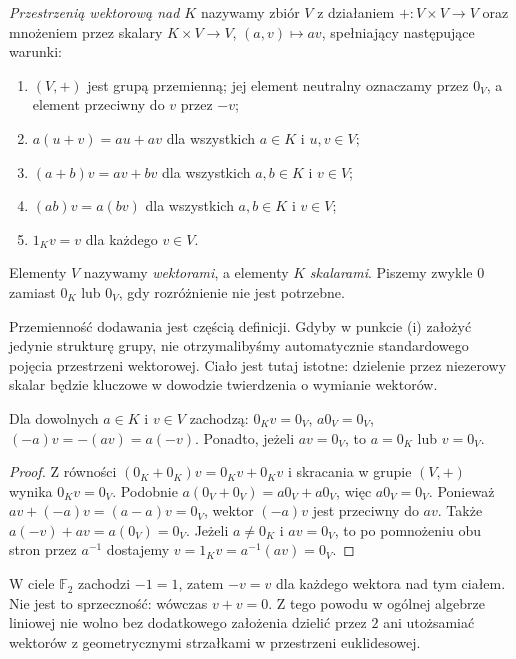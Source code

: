 \begin{definicja}
\label{def:lin-przestrzen-wektorowa}
\emph{Przestrzenią wektorową nad \(K\)} nazywamy zbiór \(V\)
z działaniem \(+\colon V\times V\to V\) oraz
mnożeniem przez skalary \(K\times V\to V\), \((a,v)\mapsto av\),
spełniający następujące warunki:
\begin{enumerate}[label=(\roman*)]
\item \((V,+)\) jest grupą przemienną; jej element neutralny
      oznaczamy przez \(0_V\), a element przeciwny do \(v\) przez \(-v\);
\item \(a(u+v)=au+av\) dla wszystkich \(a\in K\) i \(u,v\in V\);
\item \((a+b)v=av+bv\) dla wszystkich \(a,b\in K\) i \(v\in V\);
\item \((ab)v=a(bv)\) dla wszystkich \(a,b\in K\) i \(v\in V\);
\item \(1_Kv=v\) dla każdego \(v\in V\).
\end{enumerate}
Elementy \(V\) nazywamy \emph{wektorami}, a elementy \(K\)
\emph{skalarami}. Piszemy zwykle \(0\) zamiast \(0_K\) lub
\(0_V\), gdy rozróżnienie nie jest potrzebne.
\end{definicja}

Przemienność dodawania jest częścią definicji. Gdyby w punkcie
(i) założyć jedynie strukturę grupy, nie otrzymalibyśmy
automatycznie standardowego pojęcia przestrzeni wektorowej.
Ciało jest tutaj istotne: dzielenie przez niezerowy skalar
będzie kluczowe w dowodzie twierdzenia o wymianie wektorów.

\begin{lemat}
\label{lem:lin-aksjomaty-konsekwencje}
Dla dowolnych \(a\in K\) i \(v\in V\) zachodzą:
\(0_Kv=0_V\), \(a0_V=0_V\), \((-a)v=-(av)=a(-v)\).
Ponadto, jeżeli \(av=0_V\), to \(a=0_K\) lub \(v=0_V\).
\end{lemat}
\begin{proof}
Z równości \((0_K+0_K)v=0_Kv+0_Kv\) i skracania w
grupie \((V,+)\) wynika \(0_Kv=0_V\).
Podobnie \(a(0_V+0_V)=a0_V+a0_V\), więc \(a0_V=0_V\).
Ponieważ \(av+(-a)v=(a-a)v=0_V\), wektor \((-a)v\)
jest przeciwny do \(av\). Także \(a(-v)+av=a(0_V)=0_V\).
Jeżeli \(a\neq0_K\) i \(av=0_V\), to po pomnożeniu
obu stron przez \(a^{-1}\) dostajemy
\(v=1_Kv=a^{-1}(av)=0_V\).
\end{proof}

\begin{uwaga}
\label{rem:lin-charakterystyka}
W ciele \(\mathbb F_2\) zachodzi \(-1=1\), zatem
\(-v=v\) dla każdego wektora nad tym ciałem.
Nie jest to sprzeczność: wówczas \(v+v=0\).
Z tego powodu w ogólnej algebrze liniowej nie wolno
bez dodatkowego założenia dzielić przez \(2\)
ani utożsamiać wektorów z geometrycznymi strzałkami
w przestrzeni euklidesowej.
\end{uwaga}

